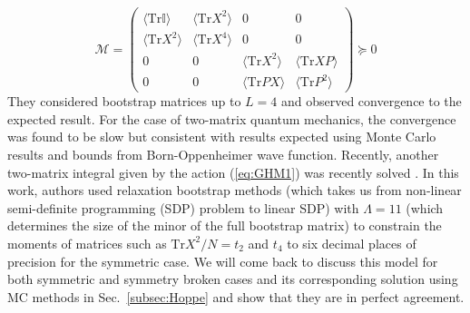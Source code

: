 \documentclass[11pt]{article}
\begin{document}
\begin{equation}
	\mathcal{M} = 
	\begin{pmatrix}
		\langle \mbox{Tr}\mathbb{I} \rangle & \langle \mbox{Tr} X^2 \rangle & 0 & 0 \\
		\langle \mbox{Tr} X^2 \rangle & \langle \mbox{Tr} X^4 \rangle  & 0 & 0 \\ 
		0 & 0 & \langle \mbox{Tr} X^2 \rangle & \langle \mbox{Tr} XP \rangle \\
		0 & 0  & \langle \mbox{Tr} PX \rangle & \langle \mbox{Tr} P^2 \rangle
	\end{pmatrix}  \succeq 0
\end{equation}
They considered bootstrap matrices up to $L=4$ and observed
convergence to the expected result. 
For the case of two-matrix quantum mechanics, the convergence
was found to be slow but consistent with results expected using Monte Carlo results and bounds from Born-Oppenheimer wave function. Recently, another two-matrix integral given by the action (\ref{eq:GHM1}) was recently solved \cite{Kazakov:2021lel}. 
In this work, authors used relaxation bootstrap methods (which takes us 
from non-linear semi-definite programming (SDP) problem to linear SDP) with
$\Lambda=11$ (which determines the size of the minor of the full bootstrap matrix) 
to constrain the moments of matrices such as $\mathrm{Tr}X^2/N = t_{2}$ and $t_{4}$ 
to six decimal places of precision for the symmetric case. We will come back to 
discuss this model for both symmetric and symmetry broken cases 
and its corresponding solution using MC methods in Sec.~\ref{subsec:Hoppe} 
and show that they are in perfect agreement.  
\end{document}
